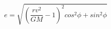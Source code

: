 \begin{equation*}
e = \sqrt{\left(\frac{rv^{2}}{GM} - 1\right)^{2} cos^{2}\phi + sin^{2}\phi} \tag{4.30}
\end{equation*}
